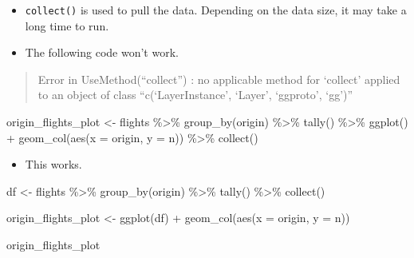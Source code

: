 \documentclass[
]{book}
\newenvironment{Shaded}{\begin{snugshade}}{\end{snugshade}}
\newcommand{\AttributeTok}[1]{\textcolor[rgb]{0.77,0.63,0.00}{#1}}
\newcommand{\FunctionTok}[1]{\textcolor[rgb]{0.00,0.00,0.00}{#1}}
\newcommand{\NormalTok}[1]{#1}
\newcommand{\OtherTok}[1]{\textcolor[rgb]{0.56,0.35,0.01}{#1}}
\newcommand{\SpecialCharTok}[1]{\textcolor[rgb]{0.00,0.00,0.00}{#1}}
\providecommand{\tightlist}{%
  \setlength{\itemsep}{0pt}\setlength{\parskip}{0pt}}
\begin{document}
\begin{itemize}
\item
  \texttt{collect()} is used to pull the data. Depending on the data size, it may take a long time to run.
\item
  The following code won't work.
\end{itemize}

\begin{quote}
Error in UseMethod(``collect'') : no applicable method for `collect' applied to an object of class ``c(`LayerInstance', `Layer', `ggproto', `gg')''
\end{quote}

\begin{Shaded}
\begin{Highlighting}[]
\NormalTok{origin\_flights\_plot }\OtherTok{\textless{}{-}}\NormalTok{ flights }\SpecialCharTok{\%\textgreater{}\%}
  \FunctionTok{group\_by}\NormalTok{(origin) }\SpecialCharTok{\%\textgreater{}\%}
  \FunctionTok{tally}\NormalTok{() }\SpecialCharTok{\%\textgreater{}\%}
  \FunctionTok{ggplot}\NormalTok{() }\SpecialCharTok{+}
  \FunctionTok{geom\_col}\NormalTok{(}\FunctionTok{aes}\NormalTok{(}\AttributeTok{x =}\NormalTok{ origin, }\AttributeTok{y =}\NormalTok{ n)) }\SpecialCharTok{\%\textgreater{}\%}
  \FunctionTok{collect}\NormalTok{()}
\end{Highlighting}
\end{Shaded}

\begin{itemize}
\tightlist
\item
  This works.
\end{itemize}

\begin{Shaded}
\begin{Highlighting}[]
\NormalTok{df }\OtherTok{\textless{}{-}}\NormalTok{ flights }\SpecialCharTok{\%\textgreater{}\%}
  \FunctionTok{group\_by}\NormalTok{(origin) }\SpecialCharTok{\%\textgreater{}\%}
  \FunctionTok{tally}\NormalTok{() }\SpecialCharTok{\%\textgreater{}\%}
  \FunctionTok{collect}\NormalTok{()}

\NormalTok{origin\_flights\_plot }\OtherTok{\textless{}{-}} \FunctionTok{ggplot}\NormalTok{(df) }\SpecialCharTok{+}
  \FunctionTok{geom\_col}\NormalTok{(}\FunctionTok{aes}\NormalTok{(}\AttributeTok{x =}\NormalTok{ origin, }\AttributeTok{y =}\NormalTok{ n))}

\NormalTok{origin\_flights\_plot}
\end{Highlighting}
\end{Shaded}
\end{document}
